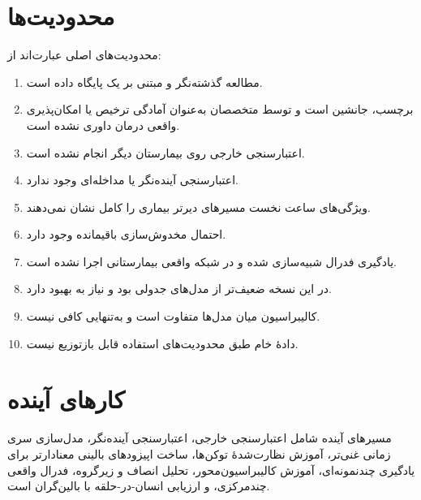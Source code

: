 \section{محدودیت‌ها}
محدودیت‌های اصلی عبارت‌اند از:
\begin{enumerate}
\item مطالعه گذشته‌نگر و مبتنی بر یک پایگاه داده است.
\item برچسب، جانشین است و توسط متخصصان به‌عنوان آمادگی ترخیص یا امکان‌پذیری واقعی درمان داوری نشده است.
\item اعتبارسنجی خارجی روی بیمارستان دیگر انجام نشده است.
\item اعتبارسنجی آینده‌نگر یا مداخله‌ای وجود ندارد.
\item ویژگی‌های  ساعت نخست مسیرهای دیرتر بیماری را کامل نشان نمی‌دهند.
\item احتمال مخدوش‌سازی باقیمانده وجود دارد.
\item یادگیری فدرال شبیه‌سازی شده و در شبکه واقعی بیمارستانی اجرا نشده است.
\item {} در این نسخه ضعیف‌تر از مدل‌های جدولی بود و نیاز به بهبود دارد.
\item کالیبراسیون میان مدل‌ها متفاوت است و  به‌تنهایی کافی نیست.
\item دادۀ خام  طبق محدودیت‌های استفاده قابل بازتوزیع نیست.
\end{enumerate}

\section{کارهای آینده}
مسیرهای آینده شامل اعتبارسنجی خارجی، اعتبارسنجی آینده‌نگر، مدل‌سازی سری زمانی غنی‌تر، آموزش نظارت‌شدۀ توکن‌ها، ساخت اپیزودهای بالینی معنادارتر برای یادگیری چندنمونه‌ای، آموزش کالیبراسیون‌محور، تحلیل انصاف و زیرگروه، فدرال واقعی چندمرکزی، و ارزیابی انسان-در-حلقه با بالین‌گران است.
